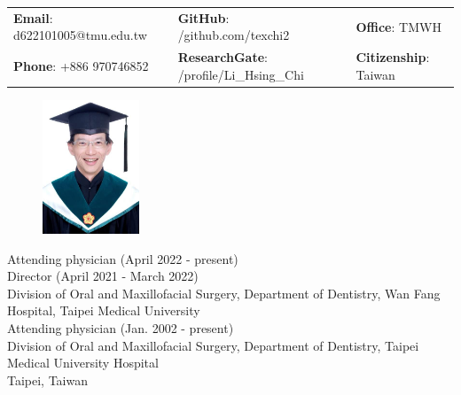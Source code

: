 \documentclass[letterpaper, 11pt]{article}
\begin{document}


\vspace{0.5cm} 
\begin{center}
\begin{tabular}{lll}
\textbf{Email}: d622101005@tmu.edu.tw      &
\hspace{0.2cm} \textbf{GitHub}: /github.com/texchi2    &
\hspace{0.2cm} 	\textbf{Office}: TMWH \\

\textbf{Phone}: +886 970746852   & 
\hspace{0.2cm} \textbf{ResearchGate}: 
/profile/Li\_Hsing\_Chi &
\hspace{0.2cm} \textbf{Citizenship}: Taiwan 
\end{tabular}
\end{center}

\begin{figure}
    \centering
    \includegraphics[height=40mm]{IMG_33A79667EE44-Tex_TMU_portrait_PhD.jpeg}%
\end{figure}

\noindent
Attending physician (April 2022 - present)\\
Director (April 2021 - March 2022)\\
Division of Oral and Maxillofacial Surgery, Department of Dentistry, Wan Fang Hospital, Taipei Medical University\\[4mm]
Attending physician (Jan. 2002 - present)\\
Division of Oral and Maxillofacial Surgery, Department of Dentistry,
Taipei Medical University Hospital\\
Taipei, Taiwan\\
\end{document}
